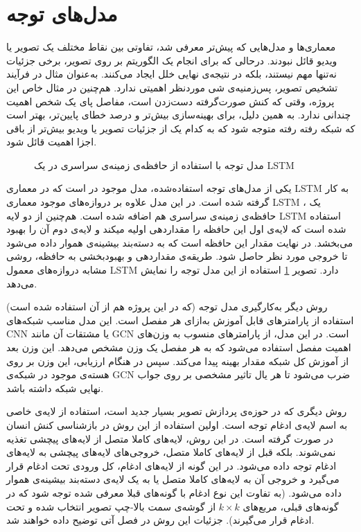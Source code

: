 \section{مدل‌های توجه}
معماری‌ها و مدل‌هایی که پیش‌تر معرفی شد، تفاوتی بین نقاط مختلف یک تصویر یا ویدیو قائل نبودند. درحالی که برای انجام یک الگوریتم بر روی تصویر، برخی جزئیات نه‌تنها مهم نیستند، بلکه در نتیجه‌ی نهایی خلل ایجاد می‌کنند.\cite{lstm_attention} به‌عنوان مثال در فرآیند تشخیص تصویر، پس‌زمنیه‌ی شی موردنظر اهمیتی ندارد. هم‌چنین در مثال خاص این پروژه، وقتی که کنش صورت‌گرفته دست‌زدن است، مفاصل پای یک شخص اهمیت چندانی ندارد. به همین دلیل، برای بهینه‌سازی بیش‌تر و درصد خطای پایین‌تر، بهتر است که شبکه رفته رفته متوجه شود که به کدام یک از جزئیات تصویر یا ویدیو بیش‌تر از باقی اجزا اهمیت قائل شود.
\begin{figure}
\caption[مدل توجه با استفاده از حافظه‌ی زمینه‌ی سراسری در یک LSTM ]{مدل توجه با استفاده از حافظه‌ی زمینه‌ی سراسری در یک LSTM \cite{lstm_attention}}
\label{fig:attention_LSTM}
\end{figure}
یکی از مدل‌های توجه استفاده‌شده‌، مدل موجود در \cite{lstm_attention} است که در معماری LSTM به کار گرفته شده است. در این مدل علاوه بر دروازه‌های موجود معماری LSTM ، یک حافظه‌ی زمینه‌ی سراسری هم اضافه شده است. هم‌چنین از دو لایه LSTM استفاده شده است که لایه‌ی اول این حافظه را مقداردهی اولیه میکند و لایه‌ی دوم آن را بهبود می‌بخشد. در نهایت مقدار این حافظه است که به دسته‌بند بیشینه‌ی هموار داده می‌شود تا خروجی مورد نظر حاصل شود. طریقه‌ی مقداردهی و بهبودبخشی به حافظه، روشی مشابه دروازه‌های معمول LSTM دارد. تصویر \ref{fig:attention_LSTM} استفاده از این مدل توجه را نمایش می‌دهد.

روش دیگر به‌کارگیری مدل توجه (که در این پروژه هم از آن استفاده شده است) استفاده از پارامترهای قابل آموزش به‌ازای هر مفصل است. این مدل مناسب شبکه‌های CNN یا مشتقات آن مانند GCN است.\cite{st-gcn} در این مدل، از پارامترهای منسوب به وزن‌های اهمیت مفصل  استفاده می‌شود که به هر مفصل یک وزن مشخص می‌دهد. این وزن بعد از آموزش کل شبکه مقدار بهینه پیدا می‌کند. سپس در هنگام ارزیابی، این وزن بر روی هسته‌ی موجود در شبکه‌ی GCN ضرب می‌شود تا هر یال تاثیر مشخصی بر روی جواب نهایی شبکه داشته باشد. 

روش دیگری که در حوزه‌ی پردازش تصویر بسیار جدید است، استفاده از لایه‌ی خاصی به اسم لایه‌ی ادغام توجه است. اولین استفاده از این روش در بازشناسی کنش انسان در \cite{attention_pooling_main} صورت گرفته است. در این روش، لایه‌های کاملا متصل از لایه‌های پیچشی تغذیه نمی‌شوند. بلکه قبل از لایه‌های کاملا متصل، خروجی‌های لایه‌های پیچشی به لایه‌های ادغام توجه داده می‌شود. در این گونه از لایه‌های ادغام، کل ورودی تحت ادغام قرار می‌گیرد و خروجی آن به لایه‌های کاملا متصل یا به یک لایه‌ی دسته‌بند بیشینه‌ی هموار داده می‌شود. (به تفاوت این نوع ادغام با گونه‌های قبلا معرفی شده توجه شود که در گونه‌های قبلی، مربع‌های $k\times k$ از گوشه‌ی سمت بالا-چپ تصویر انتخاب شده و تحت ادغام قرار می‌گیرند). جز‌ئیات این روش در فصل آتی توضیح داده خواهند شد. 




